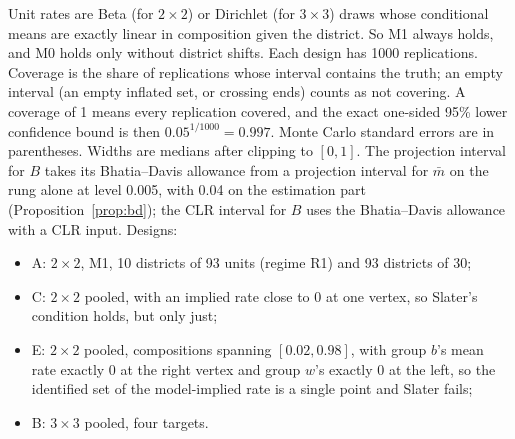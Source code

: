 Unit rates are Beta (for $2\times2$) or Dirichlet (for $3\times3$) draws whose
conditional means are exactly linear in composition given the district. So M1
always holds, and M0 holds only without district shifts. Each design has 1000
replications. Coverage is the share of replications whose interval contains the
truth; an empty interval (an empty inflated set, or crossing ends) counts as not
covering. A coverage of 1 means every replication covered, and the exact one-sided
95\% lower confidence bound is then $0.05^{1/1000}=0.997$. Monte Carlo standard
errors are in parentheses. Widths are medians after clipping to $[0,1]$. The
projection interval for $B$ takes its Bhatia--Davis allowance from a projection
interval for $\bar m$ on the rung alone at level 0.005, with 0.04 on the
estimation part (Proposition~\ref{prop:bd}); the CLR interval for $B$ uses the
Bhatia--Davis allowance with a CLR input. Designs:
\begin{itemize}
\item A: $2\times2$, M1, 10 districts of 93 units (regime R1) and 93 districts of 30;
\item C: $2\times2$ pooled, with an implied rate close to 0 at one vertex, so
Slater's condition holds, but only just;
\item E: $2\times2$ pooled, compositions spanning $[0.02,0.98]$, with group $b$'s
mean rate exactly 0 at the right vertex and group $w$'s exactly 0 at the left, so
the identified set of the model-implied rate is a single point and Slater fails;
\item B: $3\times3$ pooled, four targets.
\end{itemize}

